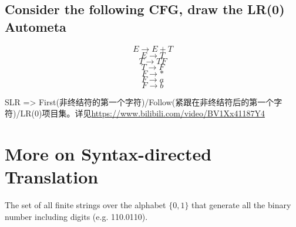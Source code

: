 \documentclass[a4paper]{exam}
\begin{document}
\subsection{Consider the following CFG, draw the LR(0) Autometa}
$$E\rightarrow E+T$$
$$E\rightarrow T$$
$$T\rightarrow TF$$
$$T\rightarrow F$$
$$F\rightarrow *$$
$$F\rightarrow a$$
$$F\rightarrow b$$
\begin{solution}
SLR => First(非终结符的第一个字符)/Follow(紧跟在非终结符后的第一个字符)/LR(0)项目集。详见\href{程序猿说}{https://www.bilibili.com/video/BV1Xx41187Y4}
\end{solution}
\section{More on Syntax-directed Translation}
The set of all finite strings over the alphabet $\{0,1\}$ that generate all the binary number including digits (e.g. 110.0110).
\end{document}
